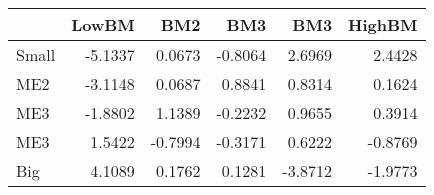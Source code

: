 \begin{tabular}{lrrrrr}
\toprule
{} &   LowBM &     BM2 &     BM3 &     BM3 &  HighBM \\
\midrule
Small & -5.1337 &  0.0673 & -0.8064 &  2.6969 &  2.4428 \\
ME2   & -3.1148 &  0.0687 &  0.8841 &  0.8314 &  0.1624 \\
ME3   & -1.8802 &  1.1389 & -0.2232 &  0.9655 &  0.3914 \\
ME3   &  1.5422 & -0.7994 & -0.3171 &  0.6222 & -0.8769 \\
Big   &  4.1089 &  0.1762 &  0.1281 & -3.8712 & -1.9773 \\
\bottomrule
\end{tabular}
